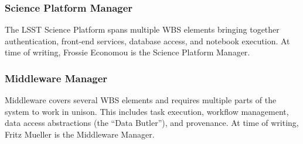 \subsubsection{Science Platform Manager}\label{role:lsplead}

The \gls{LSST} \gls{Science Platform} spans multiple \gls{WBS} elements bringing together authentication, front-end services, database access, and notebook execution.
At time of writing, Frossie Economou is the \gls{Science Platform} Manager.

\subsubsection{Middleware Manager}\label{role:mwlead}

Middleware covers several \gls{WBS} elements and requires multiple parts of the system to work in unison.
This includes task execution, workflow management, data access abstractions (the ``Data \gls{Butler}''), and \gls{provenance}.
At time of writing, Fritz Mueller is the Middleware Manager.
